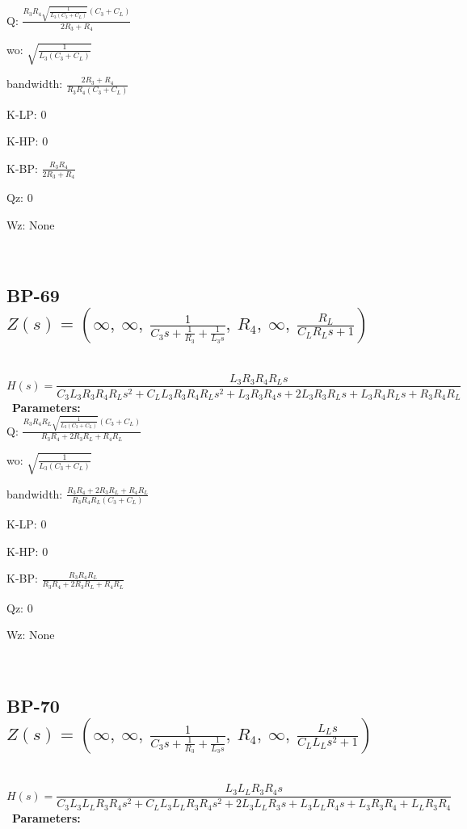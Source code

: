 \documentclass{article}
\begin{document}
Q: $\frac{R_{3} R_{4} \sqrt{\frac{1}{L_{3} \left(C_{3} + C_{L}\right)}} \left(C_{3} + C_{L}\right)}{2 R_{3} + R_{4}}$\ 

wo: $\sqrt{\frac{1}{L_{3} \left(C_{3} + C_{L}\right)}}$\ 

bandwidth: $\frac{2 R_{3} + R_{4}}{R_{3} R_{4} \left(C_{3} + C_{L}\right)}$\ 

K-LP: $0$\ 

K-HP: $0$\ 

K-BP: $\frac{R_{3} R_{4}}{2 R_{3} + R_{4}}$\ 

Qz: $0$\ 

Wz: $\text{None}$\ 

\ 

\subsection{BP-69 $Z(s) = \left( \infty, \  \infty, \  \frac{1}{C_{3} s + \frac{1}{R_{3}} + \frac{1}{L_{3} s}}, \  R_{4}, \  \infty, \  \frac{R_{L}}{C_{L} R_{L} s + 1}\right)$ } \ 
\textbf{\[H(s) = \frac{L_{3} R_{3} R_{4} R_{L} s}{C_{3} L_{3} R_{3} R_{4} R_{L} s^{2} + C_{L} L_{3} R_{3} R_{4} R_{L} s^{2} + L_{3} R_{3} R_{4} s + 2 L_{3} R_{3} R_{L} s + L_{3} R_{4} R_{L} s + R_{3} R_{4} R_{L}}\] } \ 
\textbf{Parameters:}\\ 

Q: $\frac{R_{3} R_{4} R_{L} \sqrt{\frac{1}{L_{3} \left(C_{3} + C_{L}\right)}} \left(C_{3} + C_{L}\right)}{R_{3} R_{4} + 2 R_{3} R_{L} + R_{4} R_{L}}$\ 

wo: $\sqrt{\frac{1}{L_{3} \left(C_{3} + C_{L}\right)}}$\ 

bandwidth: $\frac{R_{3} R_{4} + 2 R_{3} R_{L} + R_{4} R_{L}}{R_{3} R_{4} R_{L} \left(C_{3} + C_{L}\right)}$\ 

K-LP: $0$\ 

K-HP: $0$\ 

K-BP: $\frac{R_{3} R_{4} R_{L}}{R_{3} R_{4} + 2 R_{3} R_{L} + R_{4} R_{L}}$\ 

Qz: $0$\ 

Wz: $\text{None}$\ 

\ 

\subsection{BP-70 $Z(s) = \left( \infty, \  \infty, \  \frac{1}{C_{3} s + \frac{1}{R_{3}} + \frac{1}{L_{3} s}}, \  R_{4}, \  \infty, \  \frac{L_{L} s}{C_{L} L_{L} s^{2} + 1}\right)$ } \ 
\textbf{\[H(s) = \frac{L_{3} L_{L} R_{3} R_{4} s}{C_{3} L_{3} L_{L} R_{3} R_{4} s^{2} + C_{L} L_{3} L_{L} R_{3} R_{4} s^{2} + 2 L_{3} L_{L} R_{3} s + L_{3} L_{L} R_{4} s + L_{3} R_{3} R_{4} + L_{L} R_{3} R_{4}}\] } \ 
\textbf{Parameters:}\\ 
\end{document}
